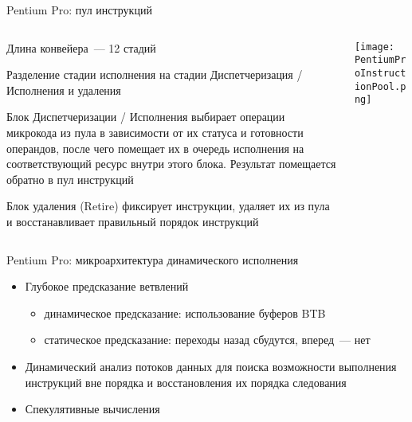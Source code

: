\documentclass[aspectratio=169,14pt]{beamer}
\begin{document}
\begin{frame}{Pentium Pro: пул инструкций}
    \begin{columns}[T,onlytextwidth]
        \begin{column}{0.6\textwidth}
            \begin{itemize}
                \begin{footnotesize}
                \item Длина конвейера~--- 12 стадий
                \item Разделение стадии исполнения на стадии Диспетчеризация / Исполнения и удаления
                \item Блок Диспетчеризации / Исполнения выбирает операции микрокода
                из пула в зависимости от их статуса и готовности операндов,
                после чего помещает их в очередь исполнения на соответствующий
                ресурс внутри этого блока. Результат помещается обратно в пул
                инструкций
                \item Блок удаления (Retire) фиксирует инструкции, удаляет
                их из пула и восстанавливает правильный порядок инструкций
                \end{footnotesize}
            \end{itemize}
        \end{column}
        \begin{column}{0.4\textwidth}
            \texttt{[image: PentiumProInstructionPool.png]}
        \end{column}
    \end{columns}
\end{frame}

\begin{frame}{Pentium Pro: микроархитектура динамического исполнения}
    \begin{itemize}
        \item Глубокое предсказание ветвлений
        \begin{itemize}
            \item динамическое предсказание: использование буферов BTB
            \item статическое предсказание: переходы назад сбудутся,
            вперед~--- нет
        \end{itemize}
        \item Динамический анализ потоков данных для поиска возможности
        выполнения инструкций вне порядка и восстановления их порядка
        следования
        \item Спекулятивные вычисления
    \end{itemize}
\end{frame}
\end{document}
